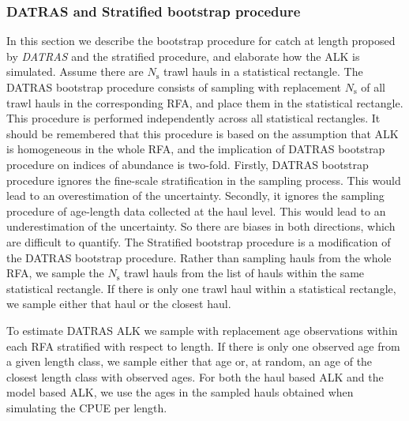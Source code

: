 \documentclass[a4paper 12pt]{article}
\numberwithin{equation}{section}
\begin{document}
\subsubsection{DATRAS and Stratified bootstrap procedure}
\label{sec:datrasstratifiedbootstrap}
In this section we describe the bootstrap procedure for catch at length proposed by \emph{DATRAS} \citep{ICES2013} and the stratified procedure, and elaborate how the ALK is simulated. Assume there are $N_{\text{s}}$ trawl hauls in a statistical rectangle. The DATRAS bootstrap procedure consists of sampling with replacement $N_{\text{s}}$ of all trawl hauls in the corresponding RFA, and place them in the statistical rectangle. This procedure is performed independently across all statistical rectangles. It should be remembered that this procedure is based on the assumption that ALK is homogeneous in the whole RFA, and the implication of DATRAS bootstrap procedure on indices of abundance is two-fold. Firstly, DATRAS bootstrap procedure ignores the fine-scale stratification in the sampling process. This would lead to an overestimation of the uncertainty. Secondly, it ignores the sampling procedure of age-length data collected at the haul level. This would lead  to an underestimation of the uncertainty. So there are biases in both directions, which are difficult to quantify. The Stratified bootstrap procedure is a modification of the DATRAS bootstrap procedure. Rather than sampling hauls from the whole RFA, we  sample the $N_{\text{s}}$ trawl hauls from the list of hauls within the same statistical rectangle. If there is only one trawl haul within a statistical rectangle, we sample either that haul or the closest haul.

To estimate DATRAS ALK we sample with replacement age observations within each RFA stratified with respect to length. If there is only one observed age from a given length class, we sample either that age or, at random, an age of the closest length class with observed ages. For both the haul based ALK and the model based ALK, we use the ages in the sampled hauls obtained when simulating the CPUE per length.
\end{document}
